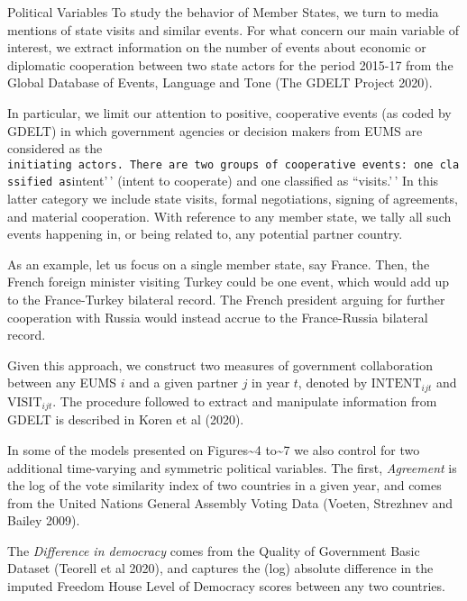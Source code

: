 \documentclass[
  ignorenonframetext,
  aspectratio=16,
]{beamer}
\begin{document}
\begin{frame}[fragile]{Political Variables}
\protect\hypertarget{political-variables}{}
To study the behavior of Member States, we turn to media mentions of
state visits and similar events. For what concern our main variable of
interest, we extract information on the number of events about economic
or diplomatic cooperation between two state actors for the period
2015-17 from the Global Database of Events, Language and Tone (The GDELT
Project 2020).

In particular, we limit our attention to positive, cooperative events
(as coded by GDELT) in which government agencies or decision makers from
EUMS are considered as the
\texttt{initiating\ actors\textquotesingle{}\textquotesingle{}.\ There\ are\ two\ groups\ of\ cooperative\ events:\ one\ classified\ as}intent'\,'
(intent to cooperate) and one classified as ``visits.'\,' In this latter
category we include state visits, formal negotiations, signing of
agreements, and material cooperation. With reference to any member
state, we tally all such events happening in, or being related to, any
potential partner country.

As an example, let us focus on a single member state, say France. Then,
the French foreign minister visiting Turkey could be one event, which
would add up to the France-Turkey bilateral record. The French president
arguing for further cooperation with Russia would instead accrue to the
France-Russia bilateral record.

Given this approach, we construct two measures of government
collaboration between any EUMS \(i\) and a given partner \(j\) in year
\(t\), denoted by \(\text{INTENT}_{ijt}\) and \(\text{VISIT}_{ijt}\).
The procedure followed to extract and manipulate information from GDELT
is described in Koren et al (2020).

In some of the models presented on Figures\textasciitilde4
to\textasciitilde7 we also control for two additional time-varying and
symmetric political variables. The first, \emph{Agreement} is the log of
the vote similarity index of two countries in a given year, and comes
from the United Nations General Assembly Voting Data (Voeten, Strezhnev
and Bailey 2009).

The \emph{Difference in democracy} comes from the Quality of Government
Basic Dataset (Teorell et al 2020), and captures the (log) absolute
difference in the imputed Freedom House Level of Democracy scores
between any two countries.
\end{frame}
\end{document}
